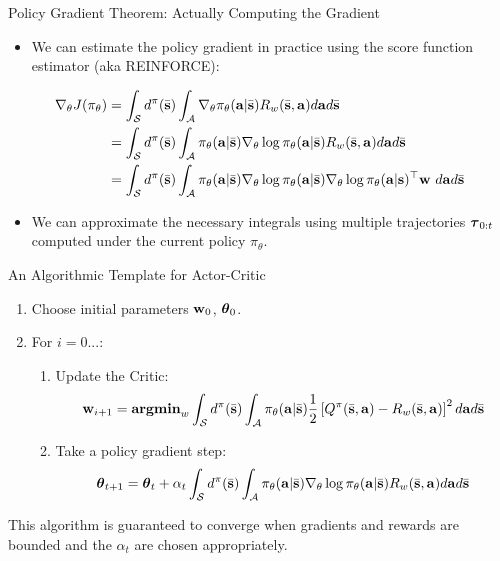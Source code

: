 \documentclass[]{beamer}
\begin{document}
\begin{frame}{Policy Gradient Theorem: Actually Computing the Gradient}
    \begin{itemize}
        \item We can estimate the policy gradient in practice using the score function estimator (aka REINFORCE):
    \end{itemize}
    \begin{align*}
         \nabla_\theta J(\pi_\theta) &=  \int_\cS d^\pi(\bar \vs) \int_\cA \nabla_\theta \pi_\theta(\va | \bar \vs) R_w(\bar \vs, \va) d\va d\bar \vs\\
         &= \int_\cS d^\pi(\bar \vs) \int_\cA \pi_\theta(\va | \bar \vs) \nabla_\theta \log \pi_\theta(\va | \bar \vs) R_w(\bar \vs, \va) d\va d\bar \vs\\
         &= \int_\cS d^\pi(\bar \vs) \int_\cA \pi_\theta(\va | \bar \vs) \nabla_\theta \log \pi_\theta(\va | \bar \vs) \nabla_\theta \log \pi_\theta(\va | \vs)^\top \vw \ d\va d\bar \vs
    \end{align*}
    \begin{itemize}
    \item We can approximate the necessary integrals using multiple trajectories $\vtau_{0:t}$ computed under the current policy $\pi_\theta$.
    \end{itemize}

\end{frame}

\begin{frame}{An Algorithmic Template for Actor-Critic}

    \begin{enumerate}
        \item Choose initial parameters $\vw_0$, $\vtheta_0$.
        \item For $i = 0 ... $:
        \begin{enumerate}
            \item Update the Critic:
            \[\vw_{i+1} = \textbf{argmin}_w \int_\cS d^\pi(\bar \vs) \int_\cA \pi_\theta(\va | \bar \vs)\frac{1}{2}\left[Q^\pi(\bar \vs, \va) - R_w(\bar \vs, \va) \right]^2 d\va d\bar \vs\]
            \item Take a policy gradient step:
            \[\vtheta_{t+1} = \vtheta_{t} + \alpha_t \int_\cS d^\pi(\bar \vs) \int_\cA \pi_\theta(\va | \bar \vs) \nabla_\theta \log \pi_\theta(\va | \bar \vs) R_w(\bar \vs, \va) d\va d\bar \vs \]
        \end{enumerate}
    \end{enumerate}

    This algorithm is guaranteed to converge when gradients and rewards are bounded and the $\alpha_t$ are chosen appropriately.
\end{frame}
\end{document}
